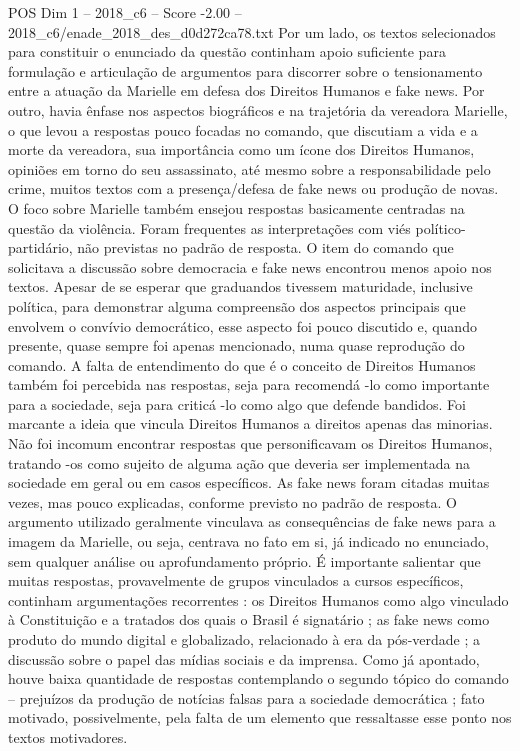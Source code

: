 \begin{textsample}{POS Dim 1 – 2018\_c6 – Score -2.00 – 2018\_c6/enade\_2018\_des\_d0d272ca78.txt}
Por um lado, os textos selecionados para constituir o enunciado da questão continham apoio suficiente para formulação e articulação de argumentos para discorrer sobre o tensionamento entre a atuação da Marielle em defesa dos Direitos Humanos e fake news.
Por outro, havia ênfase nos aspectos biográficos e na trajetória da vereadora Marielle, o que levou a respostas pouco focadas no comando, que discutiam a vida e a morte da vereadora, sua importância como um ícone dos Direitos Humanos, opiniões em torno do seu assassinato, até mesmo sobre a responsabilidade pelo crime, muitos textos com a presença/defesa de fake news ou produção de novas.
O foco sobre Marielle também ensejou respostas basicamente centradas na questão da violência.
Foram frequentes as interpretações com viés político-partidário, não previstas no padrão de resposta.
O item do comando que solicitava a discussão sobre democracia e fake news encontrou menos apoio nos textos.
Apesar de se esperar que graduandos tivessem maturidade, inclusive política, para demonstrar alguma compreensão dos aspectos principais que envolvem o convívio democrático, esse aspecto foi pouco discutido e, quando presente, quase sempre foi apenas mencionado, numa quase reprodução do comando.
A falta de entendimento do que é o conceito de Direitos Humanos também foi percebida nas respostas, seja para recomendá -lo como importante para a sociedade, seja para criticá -lo como algo que defende bandidos.
Foi marcante a ideia que vincula Direitos Humanos a direitos apenas das minorias.
Não foi incomum encontrar respostas que personificavam os Direitos Humanos, tratando -os como sujeito de alguma ação que deveria ser implementada na sociedade em geral ou em casos específicos.
As fake news foram citadas muitas vezes, mas pouco explicadas, conforme previsto no padrão de resposta.
O argumento utilizado geralmente vinculava as consequências de fake news para a imagem da Marielle, ou seja, centrava no fato em si, já indicado no enunciado, sem qualquer análise ou aprofundamento próprio.
É importante salientar que muitas respostas, provavelmente de grupos vinculados a cursos específicos, continham argumentações recorrentes : os Direitos Humanos como algo vinculado à Constituição e a tratados dos quais o Brasil é signatário ; as fake news como produto do mundo digital e globalizado, relacionado à era da pós-verdade ; a discussão sobre o papel das mídias sociais e da imprensa.
Como já apontado, houve baixa quantidade de respostas contemplando o segundo tópico do comando – prejuízos da produção de notícias falsas para a sociedade democrática ; fato motivado, possivelmente, pela falta de um elemento que ressaltasse esse ponto nos textos motivadores.

\end{textsample}
